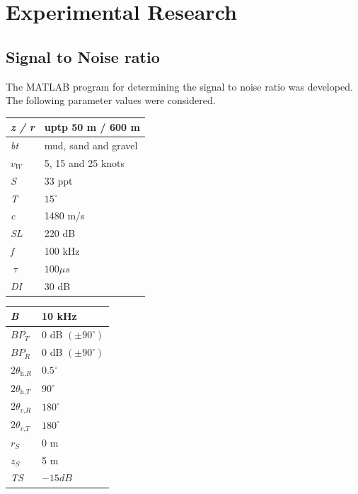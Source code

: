 \chapter*{Experimental Research}


\section{ Signal to Noise ratio } \label{ Signal to Noise ratio } 
\noindent  The MATLAB program for determining the signal to noise ratio was developed. The following parameter values were considered.

\begin{minipage}[b]{.40\textwidth}
   \centering
   \begin{tabular}{ | l | l |}
     \hline
     \textit{z / r} & uptp 50 m / 600 m \\ \hline
     \textit{bt} & mud, sand and gravel \\ \hline
     \textit{$v_{W}$} & 5, 15 and 25 knots \\ \hline
     \textit{S} & 33 ppt \\ \hline
     \textit{T} & $15^{\circ}$ \\ \hline
     \textit{c} & 1480 m/s \\ \hline
     \textit{SL} & 220 dB \\ \hline
     \textit{f} & 100 kHz \\ \hline
      $ \uptau $& $100 \mu s $\\ \hline
      \textit{DI} & 30 dB \\
     \hline
   \end{tabular}
  \end{minipage}\qquad
\begin{minipage}[b]{.40\textwidth}
   \centering
   \begin{tabular}{ | l | l |}
     \hline
      \textit{B} & 10 kHz \\ \hline
     \textit{$BP_{T}$} & 0 dB $(\pm 90^{\circ})$ \\ \hline
     \textit{$BP_{R}$} & 0 dB $(\pm 90^{\circ})$\\ \hline
     $2\theta_{\textit{h,R}} $ & $0.5^{\circ}$\\ \hline
     $2\theta_{\textit{h,T}} $ & $90^{\circ}$ \\ \hline
     $2\theta_{\textit{v,R}} $ & $180^{\circ}$ \\ \hline
     $2\theta_{\textit{v,T}} $ & $180^{\circ}$ \\ \hline
     \textit{$r_{S}$} & 0 m \\ \hline
      \textit{$z_{S}$} & 5 m \\ \hline
       \textit{TS} & $ -15 dB$ \\
   \hline
   \end{tabular}
   \end{minipage}
   \newpage
   
